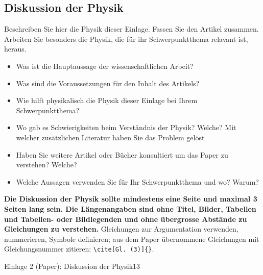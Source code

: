 \subsection{Diskussion der Physik}
\begin{hinweise}
Beschreiben Sie hier die Physik dieser Einlage. Fassen Sie den Artikel zusammen. Arbeiten Sie besonders die
Physik, die für ihr Schwerpunktthema relavant ist, heraus.
\begin{itemize}\itemsep0pt
\item Was ist die Hauptaussage der wissenschaftlichen Arbeit?
\item Was sind die Voraussetzungen für den Inhalt des Artikels?
\item Wie hilft physikalisch die Physik dieser Einlage bei Ihrem Schwerpunktthema?
\item Wo gab es Schwierigkeiten beim Verständnis der Physik? Welche? Mit welcher zusätzlichen Literatur haben Sie das Problem gelöst
\item Haben Sie weitere Artikel oder Bücher konsultiert um das Paper zu verstehen? Welche?
\item Welche Aussagen verwenden Sie für Ihr Schwerpunktthema und wo? Warum?
\end{itemize}
\textbf{Die Diskussion der Physik sollte mindestens eine Seite und maximal 3 Seiten lang sein. Die
Längenangaben sind ohne Titel, Bilder, Tabellen und Tabellen- oder Bildlegenden und ohne übergrosse Abstände
zu Gleichungen zu verstehen.}
Gleichungen zur Argumentation verwenden, nummerieren, Symbole definieren; aus dem Paper übernommene Gleichungen
mit Gleichungsnummer zitieren: \texttt{\textbackslash cite[Gl.~(3)]\{\PaperKey\}}.
\end{hinweise}
\begin{umfang}{Einlage 2 (Paper): Diskussion der Physik}{1}{3}


\end{umfang}

